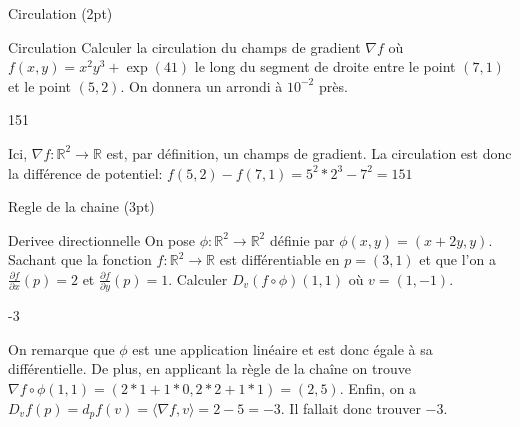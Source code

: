 \documentclass[12pt]{article}
\begin{document}
\begin{quiz}[points=2]
  {Circulation (2pt)}

  \begin{numerical}{Circulation}
    Calculer la circulation du champs de gradient $\nabla f$ o\`{u} $f(x,y) = x^2 y^3 + \exp(41)$ le long du segment de droite entre le point $(7,1)$ et le point $(5,2)$. On donnera un arrondi \`{a} $10^{-2}$ pr\`{e}s.
\item 151
  \end{numerical}

\end{quiz}
Ici, $\nabla f: \mathbb R^2 \to \mathbb R$ est, par définition, un champs de gradient. La circulation est donc la différence de potentiel: $f(5,2) - f(7,1) =  5^2 * 2^3 - 7^2 = 151$


\begin{quiz}[points=3]
  {Regle de la chaine (3pt)}

  \begin{numerical}{Derivee directionnelle}
    On pose $\phi: \mathbb R^2 \to \mathbb R^2$ d\'{e}finie par $\phi(x,y) = (x+2y, y)$. Sachant que la fonction $f:\mathbb R^2 \to \mathbb R$ est diff\'{e}rentiable en $p=(3,1)$ et que l'on a $\frac{\partial f}{\partial x}(p) = 2$ et $\frac{\partial f}{\partial y}(p) = 1$. Calculer $D_v (f \circ \phi)(1,1)$ o\`{u} $v=(1,-1)$.
\item -3
  \end{numerical}
\end{quiz}
On remarque que $\phi$ est une application linéaire et est donc égale à sa différentielle. De plus, en applicant la règle de la chaîne on trouve $\nabla f \circ \phi (1,1) = (2*1 + 1 * 0, 2*2+1*1) = (2,5)$. Enfin, on a  $D_v f(p) = d_p f(v) =  \langle \nabla f, v \rangle = 2 - 5 = -3$. Il fallait donc trouver $-3$.
% 
% 



\end{document}
